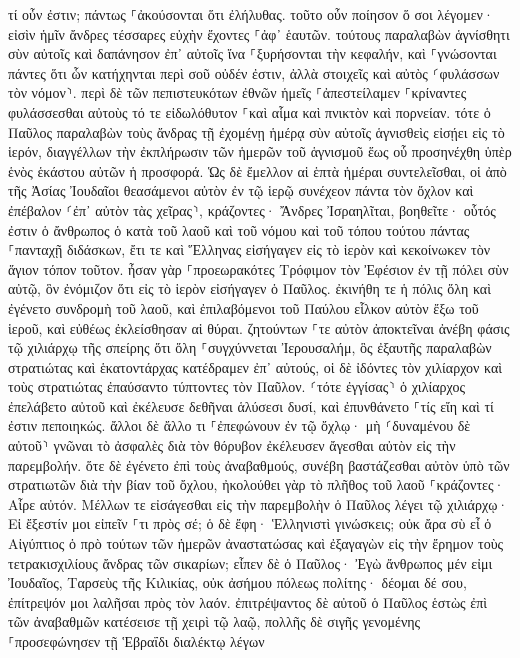 \documentclass[twoside, 9pt]{extreport}
\begin{document}
τί οὖν ἐστιν; πάντως ⸀ἀκούσονται ὅτι ἐλήλυθας. 
τοῦτο οὖν ποίησον ὅ σοι λέγομεν· εἰσὶν ἡμῖν ἄνδρες τέσσαρες εὐχὴν ἔχοντες ⸀ἀφ᾽ ἑαυτῶν. 
τούτους παραλαβὼν ἁγνίσθητι σὺν αὐτοῖς καὶ δαπάνησον ἐπ᾽ αὐτοῖς ἵνα ⸀ξυρήσονται τὴν κεφαλήν, καὶ ⸀γνώσονται πάντες ὅτι ὧν κατήχηνται περὶ σοῦ οὐδέν ἐστιν, ἀλλὰ στοιχεῖς καὶ αὐτὸς ⸂φυλάσσων τὸν νόμον⸃. 
περὶ δὲ τῶν πεπιστευκότων ἐθνῶν ἡμεῖς ⸀ἀπεστείλαμεν ⸀κρίναντες φυλάσσεσθαι αὐτοὺς τό τε εἰδωλόθυτον ⸀καὶ αἷμα καὶ πνικτὸν καὶ πορνείαν. 
τότε ὁ Παῦλος παραλαβὼν τοὺς ἄνδρας τῇ ἐχομένῃ ἡμέρᾳ σὺν αὐτοῖς ἁγνισθεὶς εἰσῄει εἰς τὸ ἱερόν, διαγγέλλων τὴν ἐκπλήρωσιν τῶν ἡμερῶν τοῦ ἁγνισμοῦ ἕως οὗ προσηνέχθη ὑπὲρ ἑνὸς ἑκάστου αὐτῶν ἡ προσφορά. 
Ὡς δὲ ἔμελλον αἱ ἑπτὰ ἡμέραι συντελεῖσθαι, οἱ ἀπὸ τῆς Ἀσίας Ἰουδαῖοι θεασάμενοι αὐτὸν ἐν τῷ ἱερῷ συνέχεον πάντα τὸν ὄχλον καὶ ἐπέβαλον ⸂ἐπ᾽ αὐτὸν τὰς χεῖρας⸃, 
κράζοντες· Ἄνδρες Ἰσραηλῖται, βοηθεῖτε· οὗτός ἐστιν ὁ ἄνθρωπος ὁ κατὰ τοῦ λαοῦ καὶ τοῦ νόμου καὶ τοῦ τόπου τούτου πάντας ⸀πανταχῇ διδάσκων, ἔτι τε καὶ Ἕλληνας εἰσήγαγεν εἰς τὸ ἱερὸν καὶ κεκοίνωκεν τὸν ἅγιον τόπον τοῦτον. 
ἦσαν γὰρ ⸀προεωρακότες Τρόφιμον τὸν Ἐφέσιον ἐν τῇ πόλει σὺν αὐτῷ, ὃν ἐνόμιζον ὅτι εἰς τὸ ἱερὸν εἰσήγαγεν ὁ Παῦλος. 
ἐκινήθη τε ἡ πόλις ὅλη καὶ ἐγένετο συνδρομὴ τοῦ λαοῦ, καὶ ἐπιλαβόμενοι τοῦ Παύλου εἷλκον αὐτὸν ἔξω τοῦ ἱεροῦ, καὶ εὐθέως ἐκλείσθησαν αἱ θύραι. 
ζητούντων ⸀τε αὐτὸν ἀποκτεῖναι ἀνέβη φάσις τῷ χιλιάρχῳ τῆς σπείρης ὅτι ὅλη ⸀συγχύννεται Ἰερουσαλήμ, 
ὃς ἐξαυτῆς παραλαβὼν στρατιώτας καὶ ἑκατοντάρχας κατέδραμεν ἐπ᾽ αὐτούς, οἱ δὲ ἰδόντες τὸν χιλίαρχον καὶ τοὺς στρατιώτας ἐπαύσαντο τύπτοντες τὸν Παῦλον. 
⸂τότε ἐγγίσας⸃ ὁ χιλίαρχος ἐπελάβετο αὐτοῦ καὶ ἐκέλευσε δεθῆναι ἁλύσεσι δυσί, καὶ ἐπυνθάνετο ⸀τίς εἴη καὶ τί ἐστιν πεποιηκώς. 
ἄλλοι δὲ ἄλλο τι ⸀ἐπεφώνουν ἐν τῷ ὄχλῳ· μὴ ⸂δυναμένου δὲ αὐτοῦ⸃ γνῶναι τὸ ἀσφαλὲς διὰ τὸν θόρυβον ἐκέλευσεν ἄγεσθαι αὐτὸν εἰς τὴν παρεμβολήν. 
ὅτε δὲ ἐγένετο ἐπὶ τοὺς ἀναβαθμούς, συνέβη βαστάζεσθαι αὐτὸν ὑπὸ τῶν στρατιωτῶν διὰ τὴν βίαν τοῦ ὄχλου, 
ἠκολούθει γὰρ τὸ πλῆθος τοῦ λαοῦ ⸀κράζοντες· Αἶρε αὐτόν. 
Μέλλων τε εἰσάγεσθαι εἰς τὴν παρεμβολὴν ὁ Παῦλος λέγει τῷ χιλιάρχῳ· Εἰ ἔξεστίν μοι εἰπεῖν ⸀τι πρὸς σέ; ὁ δὲ ἔφη· Ἑλληνιστὶ γινώσκεις; 
οὐκ ἄρα σὺ εἶ ὁ Αἰγύπτιος ὁ πρὸ τούτων τῶν ἡμερῶν ἀναστατώσας καὶ ἐξαγαγὼν εἰς τὴν ἔρημον τοὺς τετρακισχιλίους ἄνδρας τῶν σικαρίων; 
εἶπεν δὲ ὁ Παῦλος· Ἐγὼ ἄνθρωπος μέν εἰμι Ἰουδαῖος, Ταρσεὺς τῆς Κιλικίας, οὐκ ἀσήμου πόλεως πολίτης· δέομαι δέ σου, ἐπίτρεψόν μοι λαλῆσαι πρὸς τὸν λαόν. 
ἐπιτρέψαντος δὲ αὐτοῦ ὁ Παῦλος ἑστὼς ἐπὶ τῶν ἀναβαθμῶν κατέσεισε τῇ χειρὶ τῷ λαῷ, πολλῆς δὲ σιγῆς γενομένης ⸀προσεφώνησεν τῇ Ἑβραΐδι διαλέκτῳ λέγων 
\end{document}
